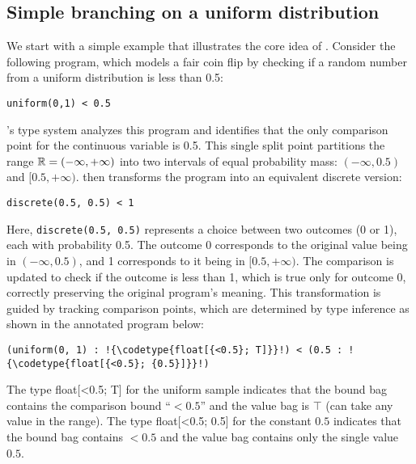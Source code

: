 \documentclass[acmsmall,screen,dvipsnames,x11names,nonacm,anonymous,review]{acmart}
\newcommand{\codetype}[1]{\textcolor{typecolor}{\ttfamily\small#1}}
\begin{document}
\subsection{Simple branching on a uniform distribution}

We start with a simple example that illustrates the core idea of \Slice{}. Consider the following program, which models a fair coin flip by checking if a random number from a uniform distribution is less than 0.5:

\begin{lstlisting}[aboveskip=1em,belowskip=1em]
    uniform(0,1) < 0.5
\end{lstlisting}

\noindent \Slice{}'s type system analyzes this program and identifies that the only comparison point for the continuous variable is 0.5. This single split point partitions the range $\mathbb{R} = (-\infty, +\infty)$ into two intervals of equal probability mass: $(-\infty, 0.5)$ and $[0.5, +\infty)$. \Slice{} then transforms the program into an equivalent discrete version:

\begin{lstlisting}[aboveskip=1em,belowskip=1em]
    discrete(0.5, 0.5) < 1
\end{lstlisting}

\noindent Here, \texttt{discrete(0.5, 0.5)} represents a choice between two outcomes (0 or 1), each with probability 0.5. The outcome 0 corresponds to the original value being in $(-\infty, 0.5)$, and 1 corresponds to it being in $[0.5, +\infty)$. The comparison is updated to check if the outcome is less than 1, which is true only for outcome 0, correctly preserving the original program's meaning. This transformation is guided by tracking comparison points, which are determined by type inference as shown in the annotated program below:

\begin{lstlisting}[aboveskip=1em,belowskip=1em,escapechar=!]
    (uniform(0, 1) : !{\codetype{float[{<0.5}; T]}}!) < (0.5 : !{\codetype{float[{<0.5}; {0.5}]}}!)
\end{lstlisting}

The type \codetype{float[{<0.5}; T]} for the uniform sample indicates that the bound bag contains the comparison bound ``$<\!\!0.5$'' and the value bag is $\top$ (can take any value in the range). 
The type \codetype{float[{<0.5}; {0.5}]} for the constant $0.5$ indicates that the bound bag contains $<0.5$ and the value bag contains only the single value $0.5$.
\end{document}
